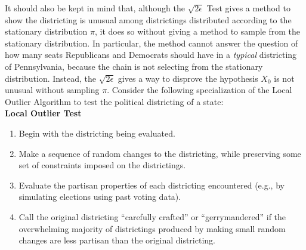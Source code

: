 \documentclass[12pt]{article}
\begin{document}
It should also be kept in mind that, although the \( \sqrt{2\epsilon} \)
Test gives a method to show the districting is unusual among
districtings distributed according to the stationary distribution \( \pi
\), it does so without giving a method to sample from the stationary
distribution.  In particular, the method cannot answer the question of
how many seats Republicans and Democrats should have in a \emph{typical}
districting of Pennsylvania, because the chain is not selecting from the
stationary distribution.  Instead, the \( \sqrt{2\epsilon} \) gives a way
to disprove the hypothesis \( X_{0} \) is not unusual without sampling \( \pi \).
Consider the following specialization of the Local Outlier Algorithm to
test the political districting of a state:\\
\textbf{Local Outlier Test}%
\begin{enumerate}
    \item
        Begin with the districting being evaluated.
    \item
        \label{enum:significance:mcstep} Make a sequence of random
        changes to the districting, while preserving some set of
        constraints imposed on the districtings.
    \item
        Evaluate the partisan properties of each districting encountered
        (e.g., by simulating elections using past voting data).
    \item
        \label{enum:significance:crafted} Call the original districting
        ``carefully crafted'' or ``gerrymandered'' if the overwhelming
        majority of districtings produced by making small random changes
        are less partisan than the original districting.
\end{enumerate}
\end{document}
